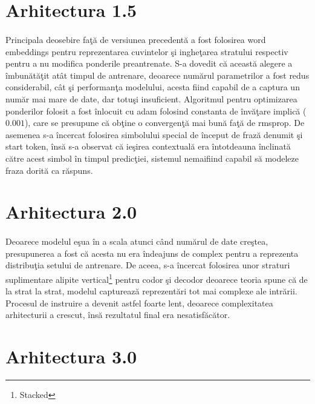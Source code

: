 \section{Arhitectura 1.5}

\paragraph{}
Principala deosebire fa\c t\u a de versiunea precedent\u a a fost folosirea word embeddings pentru reprezentarea cuvintelor \c si inghe\c tarea stratului respectiv pentru a nu modifica ponderile preantrenate. S-a dovedit c\u a aceast\u a alegere a \^ imbun\u at\u a\c tit at\^ at timpul de antrenare, deoarece num\u arul parametrilor a fost redus considerabil, c\^ at \c si performan\c ta modelului, acesta fiind capabil de a captura un num\u ar mai mare de date, dar totu\c si insuficient. Algoritmul pentru optimizarea ponderilor folosit a fost \^ inlocuit cu adam folosind constanta de \^ inv\u a\c tare implic\u a (\(0.001\)), care se presupune c\u a ob\c tine o convergen\c t\u a mai bun\u a fa\c t\u a de rmsprop. De asemenea s-a \^ incercat folosirea simbolului special de \^ inceput de fraz\u a denumit \c si start token, \^ ins\u a s-a observat c\u a ie\c sirea contextual\u a era \^ intotdeauna \^ inclinat\u a c\u atre acest simbol \^ in timpul predic\c tiei, sistemul nemaifiind capabil s\u a modeleze fraza dorit\u a ca r\u aspuns.

\section{Arhitectura 2.0}

\paragraph{}
Deoarece modelul e\c sua \^ in a scala atunci c\^ and num\u arul de date cre\c stea, presupunerea a fost c\u a acesta nu era \^ indeajuns de complex pentru a reprezenta distribu\c tia setului de antrenare. De aceea, s-a \^ incercat folosirea unor straturi suplimentare alipite vertical\footnote{Stacked} pentru codor \c si decodor deoarece teoria spune c\u a de la strat la strat, modelul captureaz\u a reprezent\u ari tot mai complexe ale intr\u arii. Procesul de instruire a devenit astfel foarte lent, deoarece complexitatea arhitecturii a crescut, \^ ins\u a rezultatul final era nesatisf\u ac\u ator. 

\section{Arhitectura 3.0}


